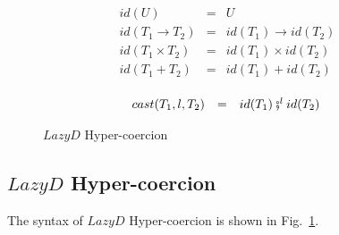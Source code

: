 \documentclass[acmsmall,review,anonymous]{acmart}\settopmatter{printfolios=true,printccs=false,printacmref=false}
\newcommand{\figref}[1]{Fig.~\ref{#1}}
\newcommand{\funrule}[3]{#1 & = & #2 & #3\\}
\newcommand{\plus}[0]{+}
\begin{document}
\begin{figure}
	\[
	\begin{array}{rclr}
	\funrule{id(U)}{U}{}
	\funrule{id(T_1 \rightarrow T_2)}{
		id(T_1) \rightarrow id(T_2)
	}{}
	\funrule{id(T_1 \times T_2)}{
		id(T_1) \times id(T_2)
	}{}
	\funrule{id(T_1 \plus T_2)}{
		id(T_1) \plus id(T_2)
	}{}
	\end{array}
	\]
	
	\[
	\begin{array}{rclr}
	\funrule{cast(T_1,l,T_2)}{
		id(T_1) \fatsemi^l id(T_2)
	}{}
	\end{array}
	\]
	

	\caption{$Lazy D$ Hyper-coercion}
	\label{fig:HC-D}
\end{figure}

\subsection{$Lazy D$ Hyper-coercion}

The syntax of $ Lazy D $ Hyper-coercion is shown in \figref{fig:HC-D}.
\end{document}
